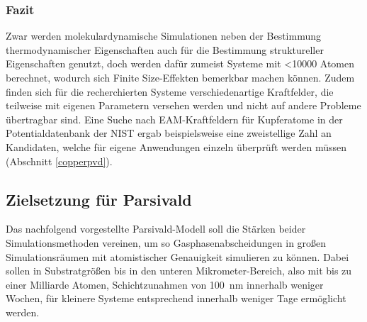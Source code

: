 \subsubsection{Fazit}
Zwar werden molekulardynamische Simulationen neben der Bestimmung thermodynamischer Eigenschaften auch für die Bestimmung struktureller Eigenschaften genutzt, doch werden dafür zumeist Systeme mit \num{<10000} Atomen berechnet, wodurch sich Finite Size-Effekten bemerkbar machen können.
Zudem finden sich für die recherchierten Systeme verschiedenartige Kraftfelder, die teilweise mit eigenen Parametern versehen werden und nicht auf andere Probleme übertragbar sind.
Eine Suche nach EAM-Kraftfeldern für Kupferatome in der Potentialdatenbank der NIST\cite{_interatomic_2014} ergab beispielsweise eine zweistellige Zahl an Kandidaten, welche für eigene Anwendungen einzeln überprüft werden müssen (Abschnitt \ref{copperpvd}).

\subsection{Zielsetzung für Parsivald}

Das nachfolgend vorgestellte Parsivald-Modell soll die Stärken beider Simulationsmethoden vereinen, um so Gasphasenabscheidungen in großen Simulationsräumen mit atomistischer Genauigkeit simulieren zu können.
Dabei sollen in Substratgrößen bis in den unteren Mikrometer-Bereich, also mit bis zu einer Milliarde Atomen, Schichtzunahmen von \SI{100}{\nano\meter} innerhalb weniger Wochen, für kleinere Systeme entsprechend innerhalb weniger Tage ermöglicht werden.
